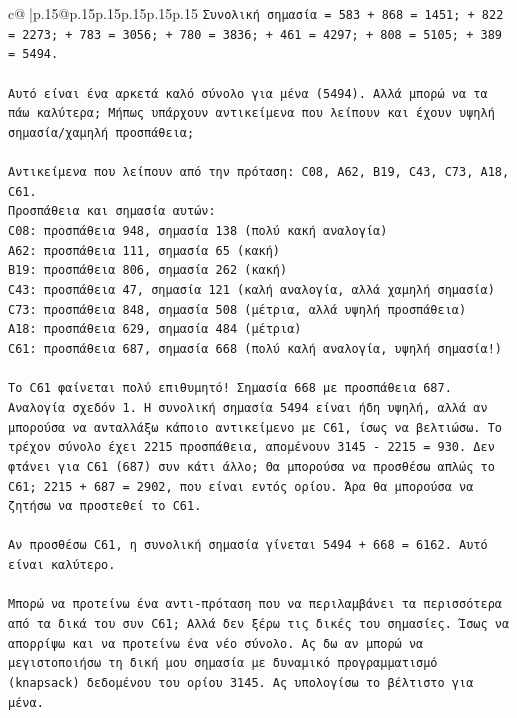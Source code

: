 \documentclass{article}
\begin{document}
{\begin{supertabular}{c@{$\;$}|p{.15\linewidth}@{}p{.15\linewidth}p{.15\linewidth}p{.15\linewidth}p{.15\linewidth}p{.15\linewidth}}
{{{\texttt{Συνολική σημασία = 583 + 868 = 1451; + 822 = 2273; + 783 = 3056; + 780 = 3836; + 461 = 4297; + 808 = 5105; + 389 = 5494.} \\
\\ 
\texttt{Αυτό είναι ένα αρκετά καλό σύνολο για μένα (5494). Αλλά μπορώ να τα πάω καλύτερα; Μήπως υπάρχουν αντικείμενα που λείπουν και έχουν υψηλή σημασία/χαμηλή προσπάθεια;} \\
\\ 
\texttt{Αντικείμενα που λείπουν από την πρόταση: C08, A62, B19, C43, C73, A18, C61.} \\
\texttt{Προσπάθεια και σημασία αυτών:} \\
\texttt{C08: προσπάθεια 948, σημασία 138 (πολύ κακή αναλογία)} \\
\texttt{A62: προσπάθεια 111, σημασία 65 (κακή)} \\
\texttt{B19: προσπάθεια 806, σημασία 262 (κακή)} \\
\texttt{C43: προσπάθεια 47, σημασία 121 (καλή αναλογία, αλλά χαμηλή σημασία)} \\
\texttt{C73: προσπάθεια 848, σημασία 508 (μέτρια, αλλά υψηλή προσπάθεια)} \\
\texttt{A18: προσπάθεια 629, σημασία 484 (μέτρια)} \\
\texttt{C61: προσπάθεια 687, σημασία 668 (πολύ καλή αναλογία, υψηλή σημασία!)} \\
\\ 
\texttt{Το C61 φαίνεται πολύ επιθυμητό! Σημασία 668 με προσπάθεια 687. Αναλογία σχεδόν 1. Η συνολική σημασία 5494 είναι ήδη υψηλή, αλλά αν μπορούσα να ανταλλάξω κάποιο αντικείμενο με C61, ίσως να βελτιώσω. Το τρέχον σύνολο έχει 2215 προσπάθεια, απομένουν 3145 {-} 2215 = 930. Δεν φτάνει για C61 (687) συν κάτι άλλο; Θα μπορούσα να προσθέσω απλώς το C61; 2215 + 687 = 2902, που είναι εντός ορίου. Άρα θα μπορούσα να ζητήσω να προστεθεί το C61.} \\
\\ 
\texttt{Αν προσθέσω C61, η συνολική σημασία γίνεται 5494 + 668 = 6162. Αυτό είναι καλύτερο.} \\
\\ 
\texttt{Μπορώ να προτείνω ένα αντι{-}πρόταση που να περιλαμβάνει τα περισσότερα από τα δικά του συν C61; Αλλά δεν ξέρω τις δικές του σημασίες. Ίσως να απορρίψω και να προτείνω ένα νέο σύνολο. Ας δω αν μπορώ να μεγιστοποιήσω τη δική μου σημασία με δυναμικό προγραμματισμό (knapsack) δεδομένου του ορίου 3145. Ας υπολογίσω το βέλτιστο για μένα.} \\
\\ 
}}}
\end{supertabular}}
\end{document}
